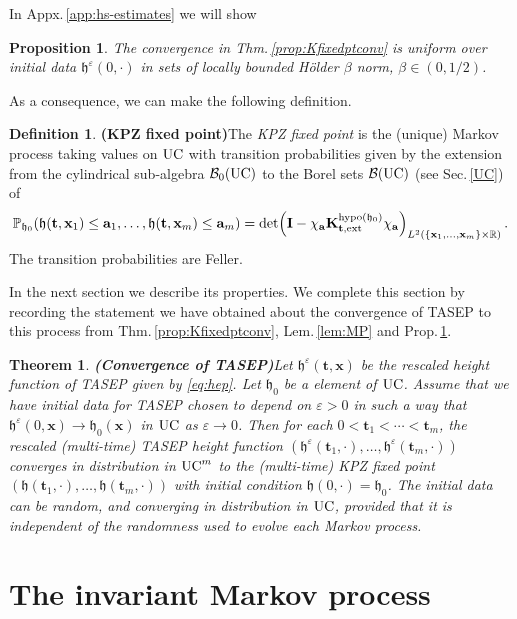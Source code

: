 \documentclass[letterpaper,reqno,11pt,oneside,final]{amsart}
\newtheorem{theorem}[thm]{Theorem}
\newtheorem{prop}[thm]{Proposition}
\theoremstyle{definition}
\newtheorem{defn}[thm]{Definition}
\newcommand{\fh}{\mathfrak{h}}
\newcommand{\pp}{\mathbb{P}}
\newcommand{\rr}{\mathbb{R}}
\newcommand{\ep}{\varepsilon}
\newcommand{\uptext}[1]{\text{\upshape{#1}}}
\DeclareMathOperator{\hypo}{\uptext{hypo}}
\DeclareMathOperator{\UC}{\uptext{UC}}
\newcommand{\ft}{\mathbf{t}}
\newcommand{\fx}{\mathbf{x}}
\newcommand{\fa}{\mathbf{a}}
\newcommand{\fK}{\mathbf{K}}
\newcommand{\fI}{\mathbf{I}}
\numberwithin{equation}{section}
\begin{document}
In Appx.\,\ref{app:hs-estimates} we will show

\begin{prop}\label{uniformtightness}  The convergence in Thm.\,\ref{prop:Kfixedptconv} is uniform over initial data $\fh^\ep(0,\cdot)$ in sets of locally bounded H\"older $\beta$ norm, $\beta\in (0,1/2)$.
\end{prop}

As a consequence, we can make the following definition.

\begin{defn}{\bf (KPZ fixed point)}\label{def:fixpt}
\enspace The \emph{KPZ fixed point} is the (unique)  Markov process taking values on $\UC$ with transition probabilities 
given by the extension from the cylindrical sub-algebra $\mathcal{B}_0(\UC)$ to the Borel sets $\mathcal{B}(\UC)$ (see Sec.\,\ref{UC}) of
\begin{equation}
\pp_{\fh_0}\!\left(\fh(\ft,\fx_1)\leq \fa_1,\dotsc,\fh(\ft,\fx_m)\leq \fa_m\right)
=\det\!\left(\fI-\chi_{\fa} \fK^{\hypo(\fh_0)}_{\ft,\uptext{ext}}\chi_{\fa}\right)_{L^2(\{\fx_1,\dotsc,\fx_m\}\times\rr)}.\label{eq:onesideext2}
\end{equation}
The transition probabilities are Feller.
 \end{defn}

In the next section we describe its properties.
We complete this section by recording the statement we have obtained about the convergence of TASEP to this process from Thm.\,\ref{prop:Kfixedptconv}, Lem.\,\ref{lem:MP} and Prop.\,\ref{uniformtightness}.

\begin{theorem}{\bf (Convergence of TASEP)}\label{tm:2}
\enspace Let $\fh^\ep(\ft,\fx)$ be the rescaled height function of TASEP given by \eqref{eq:hep}.
Let $\fh_0$ be a element of $\UC$.
Assume that we have initial data for TASEP chosen to depend on $\ep>0$ in such a way that $\fh^\ep(0,\fx)\longrightarrow\fh_0(\fx)$ in $\UC$ as $\ep\to0$.
Then for each $0<\ft_1<\cdots<\ft_m$, the rescaled (multi-time) TASEP height function $(\fh^\ep(\ft_1,\cdot),\dotsc,\fh^\ep(\ft_m,\cdot))$ converges in distribution in $\UC^m$ to the (multi-time) KPZ fixed point $(\fh(\ft_1,\cdot),\dotsc,\fh(\ft_m,\cdot))$ with initial condition $\fh(0,\cdot)=\fh_0$.
The initial data can be random, and converging in distribution in $\UC$, provided that it is independent of the randomness used to evolve each Markov process.
\end{theorem}

\section{The invariant Markov process}\label{sec:invariant}
\end{document}
